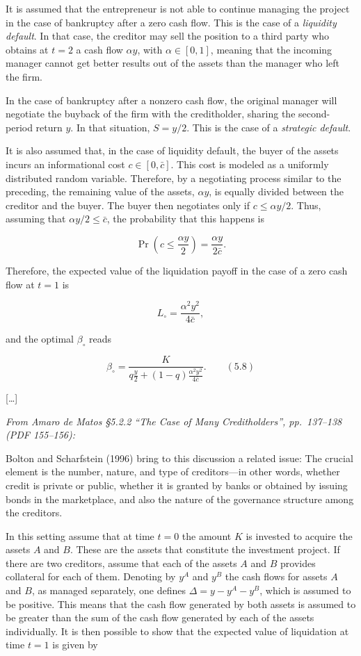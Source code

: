 \documentclass[11pt,a4paper]{article}
\begin{document}
It is assumed that the entrepreneur is not able to continue managing the project in the case of
bankruptcy after a zero cash flow. This is the case of a \emph{liquidity default}. In that case, the
creditor may sell the position to a third party who obtains at \(t = 2\) a cash flow \(\alpha y\),
with \(\alpha \in [0, 1]\), meaning that the incoming manager cannot get better results out of the
assets than the manager who left the firm.

In the case of bankruptcy after a nonzero cash flow, the original manager will negotiate the buyback
of the firm with the creditholder, sharing the second-period return \(y\). In that situation,
\(S = y/2\). This is the case of a \emph{strategic default}.

It is also assumed that, in the case of liquidity default, the buyer of the assets incurs an
informational cost \(c \in [0, \bar c]\). This cost is modeled as a uniformly distributed random
variable. Therefore, by a negotiating process similar to the preceding, the remaining value of the
assets, \(\alpha y\), is equally divided between the creditor and the buyer. The buyer then
negotiates only if \(c \leq \alpha y/2\). Thus, assuming that \(\alpha y/2 \leq \bar c\), the
probability that this happens is

\[\Pr\left(c \leq \frac{\alpha y}{2}\right) = \frac{\alpha y}{2\bar c}.\]

Therefore, the expected value of the liquidation payoff in the case of a zero cash flow at \(t = 1\)
is

\[L_\circ = \frac{\alpha^2 y^2}{4\bar c},\]

and the optimal \(\beta_\circ\) reads

\[\beta_\circ = \frac{K}{q\frac{y}{2} + (1 - q)\frac{\alpha^2 y^2}{4\bar c}}. \qquad (5.8)\]

{[}\ldots{]}

\emph{From Amaro de Matos §5.2.2 ``The Case of Many Creditholders'', pp.~137--138 (PDF 155--156):}

Bolton and Scharfstein (1996) bring to this discussion a related issue: The crucial element is the
number, nature, and type of creditors---in other words, whether credit is private or public, whether
it is granted by banks or obtained by issuing bonds in the marketplace, and also the nature of the
governance structure among the creditors.

In this setting assume that at time \(t = 0\) the amount \(K\) is invested to acquire the assets
\(A\) and \(B\). These are the assets that constitute the investment project. If there are two
creditors, assume that each of the assets \(A\) and \(B\) provides collateral for each of them.
Denoting by \(y^A\) and \(y^B\) the cash flows for assets \(A\) and \(B\), as managed separately,
one defines \(\Delta = y - y^A - y^B\), which is assumed to be positive. This means that the cash
flow generated by both assets is assumed to be greater than the sum of the cash flow generated by
each of the assets individually. It is then possible to show that the expected value of liquidation
at time \(t = 1\) is given by
\end{document}
